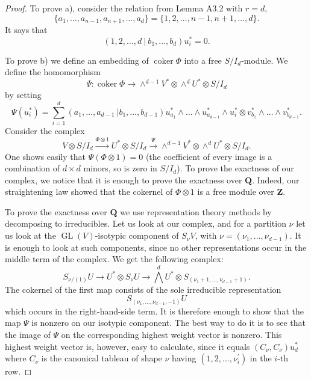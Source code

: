 \documentclass{tran-l}
\theoremstyle{plain}
\theoremstyle{remark}
\theoremstyle{definition}
\newcommand{\GL}{\operatorname{GL}}
\newcommand{\coker}{\operatorname{coker}}
\begin{document}
\begin{proof} To prove a), consider the relation from 
Lemma A3.2
with $r=d$,  
\begin{equation*}\lbrace a_{1} ,\ldots , a_{n-1}, a_{n+1},\ldots ,a_{d}\rbrace
= \lbrace 1,2,\ldots , n-1,n+1,\ldots ,d\rbrace .\end{equation*} 
 It says that
\begin{equation*}(1,2,\ldots ,d\ |\ 
b_{1} ,\ldots ,b_{d} )u_{i}^{*}=0 .\end{equation*}

To prove b) we define an embedding of $\coker \Phi $ into a free
$S/I_{d}$-module. We define the homomorphism
\begin{equation*}\Psi :\coker \Phi \rightarrow \wedge ^{d-1}V^{*}\otimes \wedge ^{d}
U^{*}\otimes S/I_{d}
\end{equation*}
by setting 
\begin{equation*}\Psi (u_{i}^{*} ) =\sum _{i=1}^{d} (a_{1} ,\ldots , a_{d-1}\ |b_{1} ,\ldots ,b_{d-1} ) u_{a_{1}}^{*}\wedge \ldots \wedge u_{a_{d-1}}^{*}\wedge u_{i}^{*}\otimes v_{b_{1}}^{*}\wedge \ldots \wedge v_{b_{d-1}}^{*} .
\end{equation*}
Consider the complex
\begin{equation*}V\otimes S/I_{d} 
\xrightarrow{\Phi \otimes 1} U^{*}\otimes S/I_{d} 
\xrightarrow {\Psi }\wedge ^{d-1}V^{*}\otimes \wedge ^{d}
U^{*}\otimes S/I_{d}.
\end{equation*}
One shows easily that 
$\Psi (\Phi \otimes 1)=0$ (the coefficient of 
every image is a combination of
$d\times d$ minors, so is zero in $S/I_{d}$).
To prove the exactness of our complex, we notice 
that it is enough to prove the exactness over 
$\mathbf{Q}$. Indeed,
our straightening law showed that the cokernel of 
$\Phi \otimes 1$ is a free module
over $\mathbf{Z}$. 

To prove the exactness over $\mathbf{Q}$ we use representation theory
methods by decomposing to irreducibles. Let us look at our complex,
and for a partition $\nu $ let us look at the $\GL(V)$-isotypic
component of $S_{\nu }V$, with $\nu = (\nu _{1} ,\ldots ,\nu _{d-1})$. It is
enough to look at such components, since no other representations occur
in the middle term of the complex. We get the following complex:
\begin{equation*}S_{\nu /(1)}U\rightarrow U^{*}\otimes S_{\nu }
U\rightarrow \bigwedge ^{d} U^{*}\otimes S_{(\nu _{1}+1,\ldots ,\nu _{d-1}+1 )}.
\end{equation*}
The cokernel of the first map consists of the sole irreducible
representation 
\[S_{(\nu _{1} ,\ldots ,\nu _{d-1},-1)}U\]
which occurs in
the right-hand-side term. It is therefore enough to show that the map
$\Psi $ is nonzero on our isotypic component. The best way to do it is
to see that the image of $\Psi $ on the corresponding highest weight
vector is nonzero. This highest weight vector is, however, easy to
calculate, since it equals $(C_{\nu },C_{\nu })u_{d}^{*}$ where $C_{\nu }$ is the
canonical tableau of shape $\nu $ having $(1,2,\ldots ,\nu ^{\prime }_{i} )$
in the $i$-th row.
\end{proof}
\end{document}
